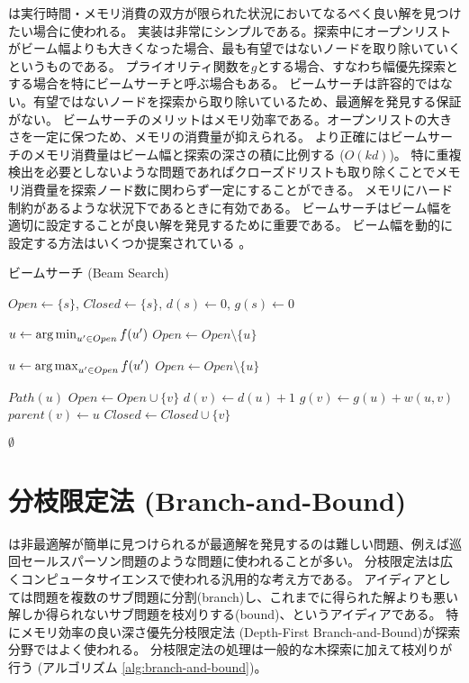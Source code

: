 は実行時間・メモリ消費の双方が限られた状況においてなるべく良い解を見つけたい場合に使われる。
実装は非常にシンプルである。探索中にオープンリストがビーム幅よりも大きくなった場合、最も有望ではないノードを取り除いていくというものである。
プライオリティ関数を$g$とする場合、すなわち幅優先探索とする場合を特にビームサーチと呼ぶ場合もある。
ビームサーチは許容的ではない。有望ではないノードを探索から取り除いているため、最適解を発見する保証がない。
ビームサーチのメリットはメモリ効率である。オープンリストの大きさを一定に保つため、メモリの消費量が抑えられる。
より正確にはビームサーチのメモリ消費量はビーム幅と探索の深さの積に比例する ($O(kd)$)。
特に重複検出を必要としないような問題であればクローズドリストも取り除くことでメモリ消費量を探索ノード数に関わらず一定にすることができる。
メモリにハード制約があるような状況下であるときに有効である。
ビームサーチはビーム幅を適切に設定することが良い解を発見するために重要である。
ビーム幅を動的に設定する方法はいくつか提案されている \cite{lemons2022beam}。


\begin{algorithm}
	\caption{ビームサーチ (Beam Search)}
	\label{alg:beam-search}
		$Open \leftarrow \{s\}$, $Closed \leftarrow \{s\}$, $d(s) \leftarrow 0$, $g(s) \leftarrow 0$\;
		 {
					$u \leftarrow \operatorname*{arg\,min}_{u' \in Open} f(u')$ \;
			$Open \leftarrow Open \setminus \{u\} $\;

			 {
				$u \leftarrow \operatorname*{arg\,max}_{u' \in Open} f(u')$
				$Open \leftarrow Open \setminus \{u\}$\;
			}

			 {
				\Return $Path(u)$\;
			}
			 {
			   {
						$Open \leftarrow Open \cup \{v\}$\;
				$d(v) \leftarrow d(u) + 1$\;
				$g(v) \leftarrow g(u) + w(u, v)$\;
						$parent(v) \leftarrow u$\;
					  }
			   {
						$Closed \leftarrow Closed \cup \{v\}$\;
					  }
			}
		 }
		\Return $\emptyset$\;
\end{algorithm}


\section{分枝限定法 (Branch-and-Bound)}
\label{sec:branch-and-bound}

は非最適解が簡単に見つけられるが最適解を発見するのは難しい問題、例えば巡回セールスパーソン問題のような問題に使われることが多い。
分枝限定法は広くコンピュータサイエンスで使われる汎用的な考え方である。
アイディアとしては問題を複数のサブ問題に分割(branch)し、これまでに得られた解よりも悪い解しか得られないサブ問題を枝刈りする(bound)、というアイディアである。
特にメモリ効率の良い深さ優先分枝限定法 (Depth-First Branch-and-Bound)が探索分野ではよく使われる。
分枝限定法の処理は一般的な木探索に加えて枝刈りが行う (アルゴリズム \ref{alg:branch-and-bound})。

